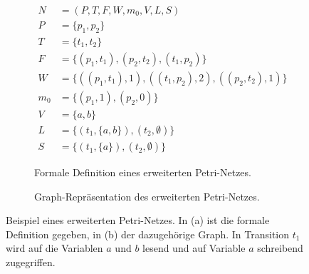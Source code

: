 \begin{figure}
\centering
	\begin{subfigure}[b]{.49\textwidth}
		$\begin{aligned}
			N &= (P,T,F,W,m_0, V, L, S)\\
			P &= \{p_1, p_2\}\\
			T &= \{t_1, t_2\}\\
			F &= \{(p_1, t_1), (p_2, t_2), (t_1, p_2)\}\\
			W &= \{((p_1, t_1),1), ((t_1, p_2), 2), ((p_2, t_2),1)\}\\
			m_0 &= \{(p_1, 1), (p_2, 0)\}\\
			V &= \{a,b\}\\
			L &= \{(t_1,\{a,b\}), (t_2,\emptyset)\}\\
			S &= \{(t_1,\{a\}), (t_2,\emptyset)\}
		\end{aligned}$
		\caption{Formale Definition eines erweiterten Petri-Netzes.}\label{fig:augpetrinet:formal}
	\end{subfigure}
	\hfill
	\begin{subfigure}[b]{.49\textwidth}
		\caption{Graph-Repräsentation des erweiterten Petri-Netzes.}\label{fig:augpetrinet:graph}
	\end{subfigure}
	\caption[Beispiel eines erweiterten Petri-Netzes.]{Beispiel eines erweiterten Petri-Netzes. In (a) ist die formale Definition gegeben, in (b) der dazugehörige Graph. In Transition $t_1$ wird auf die Variablen $a$ und $b$ lesend und auf Variable $a$ schreibend zugegriffen.}\label{fig:augpetrinet}
\end{figure}